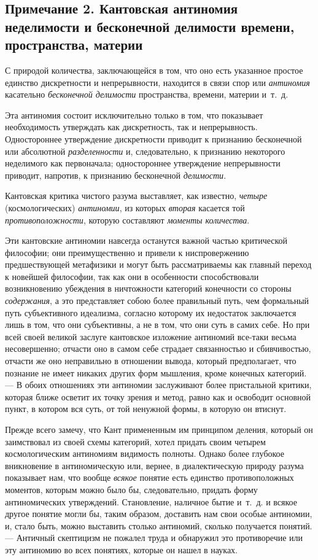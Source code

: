 \subsection*{Примечание 2. Кантовская антиномия неделимости и бесконечной
делимости времени, пространства, материи}

С природой количества, заключающейся в том, что оно есть указанное простое
единство дискретности и непрерывности, находится в связи спор или
{\em антиномия} касательно
{\em бесконечной делимости} пространства, времени,
материи и~т.~д.

Эта антиномия состоит исключительно только в том, что показывает
необходимость утверждать как дискретность, так и непрерывность.
Одностороннее утверждение дискретности приводит к признанию бесконечной или
абсолютной {\em разделенности} и, следовательно, к
признанию некоторого неделимого как первоначала; одностороннее утверждение
непрерывности приводит, напротив, к признанию бесконечной
{\em делимости}.

Кантовская критика чистого разума выставляет, как известно,
{\em четыре} (космологических)
{\em антиномии}, из которых
{\em вторая} касается той
{\em противоположности}, которую составляют
{\em моменты количества}.

Эти кантовские антиномии навсегда останутся важной частью критической
философии; они преимущественно и привели к ниспровержению предшествующей
метафизики и могут быть рассматриваемы как главный переход к новейшей
философии, так как они в особенности способствовали возникновению убеждения
в ничтожности категорий конечности со стороны
{\em содержания}, а это представляет собою более
правильный путь, чем формальный путь субъективного идеализма, согласно
которому их недостаток заключается лишь в том, что они субъективны, а не в
том, что они суть в самих себе. Но при всей своей великой заслуге
кантовское изложение антиномий все-таки весьма несовершенно; отчасти оно в
самом себе страдает связанностью и сбивчивостью, отчасти же оно неправильно
в отношении вывода, который предполагает, что познание не имеет никаких
других форм мышления, кроме конечных категорий. — В обоих отношениях эти
антиномии заслуживают более пристальной критики, которая ближе осветит их
точку зрения и метод, равно как и освободит основной пункт, в котором вся
суть, от той ненужной формы, в которую он втиснут.

Прежде всего замечу, что Кант примененным им принципом деления, который он
заимствовал из своей схемы категорий, хотел придать своим четырем
космологическим антиномиям видимость полноты. Однако более глубокое
вникновение в антиномическую или, вернее, в диалектическую природу разума
показывает нам, что вообще {\em всякое} понятие есть
единство противоположных моментов, которым можно было бы, следовательно,
придать форму антиномических утверждений. Становление, наличное бытие
и~т.~д. и всякое другое понятие могли бы, таким образом, доставить нам свои
особые антиномии, и, стало быть, можно выставить столько антиномий, сколько
получается понятий. — Античный скептицизм не пожалел труда и обнаружил это
противоречие или эту антиномию во всех понятиях, которые он нашел в науках.

